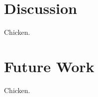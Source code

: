 \documentclass{acm_proc_article-sp}
\begin{document}
\section{Discussion}
Chicken.

\section{Future Work}
Chicken.


%

% 



%
%


\balancecolumns
\end{document}
